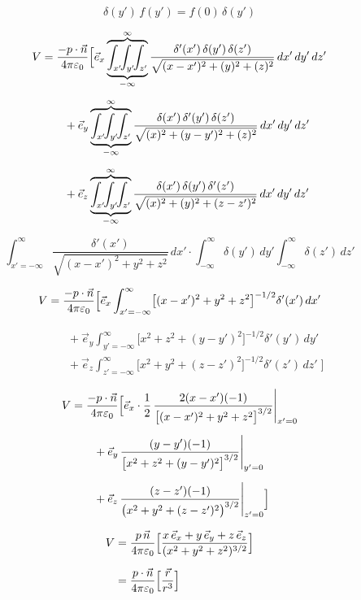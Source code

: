 \documentclass[11pt,a4paper]{article}
\begin{document}
\[ \delta(y')\,f(y') = f(0)\,\delta(y') \]

\begin{align*}
V &= \frac{-p\cdot\vec n}{4\pi\varepsilon_0}\Bigl[\vec e_x\underbrace{\overbrace{\int_{x'}\!\!\int_{y'}\!\!\int_{z'}}^{\infty}}_{-\infty}\frac{\delta'(x')\,\delta(y')\,\delta(z')}{\sqrt{(x-x')^2+(y)^2+(z)^2}}\,dx'\,dy'\,dz' \\[2mm]
 &\qquad +\vec e_y\underbrace{\overbrace{\int_{x'}\!\!\int_{y'}\!\!\int_{z'}}^{\infty}}_{-\infty}\frac{\delta(x')\,\delta'(y')\,\delta(z')}{\sqrt{(x)^2+(y-y')^2+(z)^2}}\,dx'\,dy'\,dz' \\[2mm]
 &\qquad +\vec e_z\underbrace{\overbrace{\int_{x'}\!\!\int_{y'}\!\!\int_{z'}}^{\infty}}_{-\infty}\frac{\delta(x')\,\delta(y')\,\delta'(z')}{\sqrt{(x)^2+(y)^2+(z-z')^2}}\,dx'\,dy'\,dz'
\end{align*}

\[ \int_{x'=-\infty}^{\infty}\frac{\delta'(x')}{\sqrt{(x-x')^2+y^2+z^2}}\,dx'\cdot\int_{-\infty}^{\infty}\delta(y')\,dy'\int_{-\infty}^{\infty}\delta(z')\,dz' \]

\[ V = \frac{-p\cdot\vec n}{4\pi\varepsilon_0}\Bigl[\vec e_x\int_{x'=-\infty}^{\infty}\bigl[(x-x')^2+y^2+z^2\bigr]^{-1/2}\delta'(x')\,dx' \]

\begin{align*}
 &\qquad +\vec e_y\int_{y'=-\infty}^{\infty}\bigl[x^2+z^2+(y-y')^2\bigr]^{-1/2}\delta'(y')\,dy' \\[2mm]
 &\qquad +\vec e_z\int_{z'=-\infty}^{\infty}\bigl[x^2+y^2+(z-z')^2\bigr]^{-1/2}\delta'(z')\,dz'\;\Bigr]
\end{align*}

\begin{align*}
V &= \frac{-p\cdot\vec n}{4\pi\varepsilon_0}\Bigl[\vec e_x\cdot\frac12\,\frac{2(x-x')(-1)}{\bigl[(x-x')^2+y^2+z^2\bigr]^{3/2}}\Bigg|_{x'=0} \\[2mm]
 &\qquad +\vec e_y\,\frac{(y-y')(-1)}{\bigl[x^2+z^2+(y-y')^2\bigr]^{3/2}}\Bigg|_{y'=0} \\[2mm]
 &\qquad +\vec e_z\,\frac{(z-z')(-1)}{\bigl(x^2+y^2+(z-z')^2\bigr)^{3/2}}\Bigg|_{z'=0}\Bigr]
\end{align*}

\begin{align*}
V &= \frac{p\,\vec n}{4\pi\varepsilon_0}\Bigl[\frac{x\,\vec e_x+y\,\vec e_y+z\,\vec e_z}{(x^2+y^2+z^2)^{3/2}}\Bigr] \\[2mm]
 &= \frac{p\cdot\vec n}{4\pi\varepsilon_0}\Bigl[\frac{\vec r}{r^3}\Bigr]
\end{align*}
\end{document}
